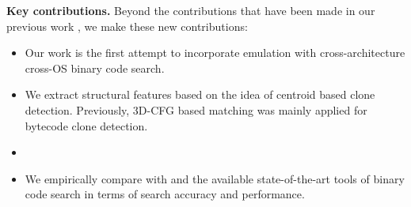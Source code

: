 \noindent\textbf{Key contributions.} Beyond the contributions that have been made in our previous work \cite{bingo}, we make these  new contributions:
\begin{itemize}[nolistsep]
\itemsep0em
\item Our work is the first attempt to incorporate emulation with cross-architecture cross-OS binary code search.
\item We extract structural features based on the idea of centroid based clone detection. Previously, 3D-CFG based matching was mainly applied for bytecode clone detection.

 \item {}
\item We empirically compare \toolNew with \tool and the available state-of-the-art tools of binary code search in terms of search accuracy and performance. %
\end{itemize}

